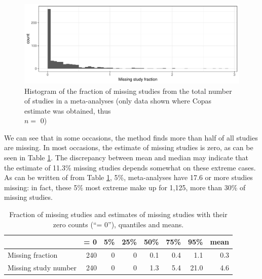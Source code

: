\documentclass[11pt,a4paper,twoside]{book}\usepackage[]{graphicx}\usepackage[]{color}
\newenvironment{knitrout}{}{} %
\begin{document}
\begin{figure}
\begin{knitrout}
\color{fgcolor}

{\centering \includegraphics[width=\textwidth-3cm]{figure/ch03_figunnamed-chunk-26-1} 

}



\end{knitrout}
\caption{Histogram of the fraction of missing studies from the total number of studies in a meta-analyses (only data shown where Copas estimate was obtained, thus \\$n =$ 0)}
\label{fig:copas.missing}
\end{figure}

We can see that in some occasions, the method finds more than half of all studies are missing. In most occasions, the estimate of missing studies is zero, as can be seen in Table \ref{copas.missing}. The discrepancy between mean and median may indicate that the estimate of 11.3\% missing studies depends somewhat on these extreme cases. As can be written of from Table \ref{copas.missing}, 5\%,  meta-analyses have 17.6 or more studies missing: in fact, these 5\% most extreme make up for 1,125, more than 30\% of missing studies.

\begin{table}[ht]
\centering
\begingroup\footnotesize
\begin{tabular}{lrrrrrrr}
  \hline
 & = 0 & 5\% & 25\% & 50\% & 75\% & 95\% & mean \\ 
  \hline
Missing fraction & 240 & 0 & 0 & 0.1 & 0.4 & 1.1 & 0.3 \\ 
  Missing study number & 240 & 0 & 0 & 1.3 & 5.4 & 21.0 & 4.6 \\ 
   \hline
\end{tabular}
\endgroup
\caption{Fraction of missing studies and estimates of missing studies with their zero counts (``= 0''), quantiles and means.} 
\label{copas.missing}
\end{table}
\end{document}
